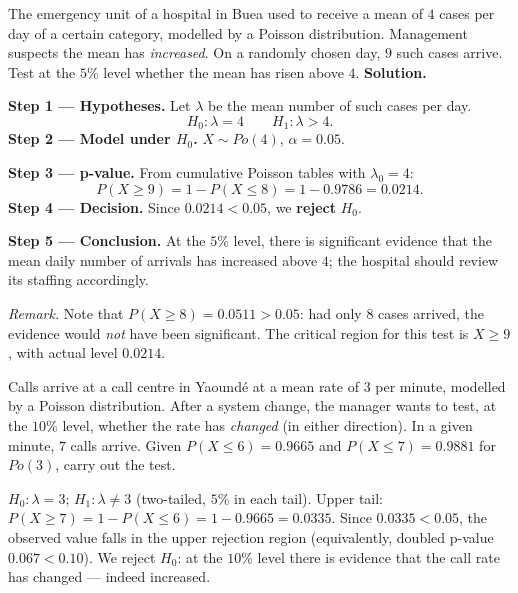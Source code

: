 \documentclass[11pt]{article}
\begin{document}
\begin{exoresolu}
The emergency unit of a hospital in Buea used to receive a mean of $4$ cases per day of a certain category, modelled by a Poisson distribution. Management suspects the mean has \emph{increased}. On a randomly chosen day, $9$ such cases arrive. Test at the $5\%$ level whether the mean has risen above $4$.
\tcblower
\textbf{Solution.}\par
\textbf{Step 1 --- Hypotheses.} Let $\lambda$ be the mean number of such cases per day.
\[ H_0 : \lambda = 4 \qquad H_1 : \lambda > 4. \]
\textbf{Step 2 --- Model under $H_0$.} $X \sim Po(4)$, $\alpha = 0.05$.\par
\textbf{Step 3 --- p-value.} From cumulative Poisson tables with $\lambda_0 = 4$:
\[ P(X \geq 9) = 1 - P(X \leq 8) = 1 - 0.9786 = 0.0214. \]
\textbf{Step 4 --- Decision.} Since $0.0214 < 0.05$, we \textbf{reject} $H_0$.\par
\textbf{Step 5 --- Conclusion.} At the $5\%$ level, there is significant evidence that the mean daily number of arrivals has increased above $4$; the hospital should review its staffing accordingly.\par
\emph{Remark.} Note that $P(X \geq 8) = 0.0511 > 0.05$: had only $8$ cases arrived, the evidence would \emph{not} have been significant. The critical region for this test is $X \geq 9$, with actual level $0.0214$.
\end{exoresolu}

\begin{exercice}
Calls arrive at a call centre in Yaound\'e at a mean rate of $3$ per minute, modelled by a Poisson distribution. After a system change, the manager wants to test, at the $10\%$ level, whether the rate has \emph{changed} (in either direction). In a given minute, $7$ calls arrive. Given $P(X \leq 6) = 0.9665$ and $P(X \leq 7) = 0.9881$ for $Po(3)$, carry out the test.
\end{exercice}

\begin{corrige}[Exercise 1]
$H_0 : \lambda = 3$; $H_1 : \lambda \neq 3$ (two-tailed, $5\%$ in each tail). Upper tail: $P(X \geq 7) = 1 - P(X \leq 6) = 1 - 0.9665 = 0.0335$. Since $0.0335 < 0.05$, the observed value falls in the upper rejection region (equivalently, doubled p-value $0.067 < 0.10$). We reject $H_0$: at the $10\%$ level there is evidence that the call rate has changed --- indeed increased.
\end{corrige}
\end{document}
